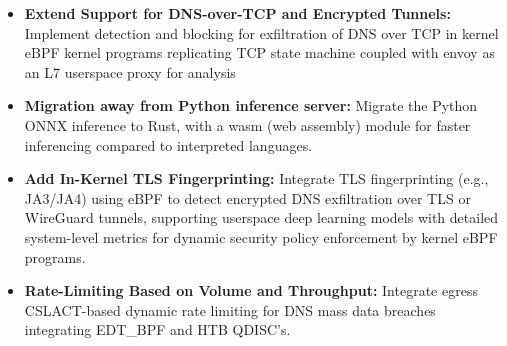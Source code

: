 \documentclass [11pt, proquest] {uwthesis}[2020/02/24]
\begin{document}
\begin{itemize}[itemsep=1pt,parsep=0pt]
  \item \textbf{Extend Support for DNS-over-TCP and Encrypted Tunnels:} Implement detection and blocking for exfiltration of DNS over TCP in kernel eBPF kernel programs replicating TCP state machine coupled with envoy as an L7 userspace proxy for analysis

  \item \textbf{Migration away from Python inference server:} Migrate the Python ONNX inference to Rust, with a wasm (web assembly) module for faster inferencing compared to interpreted languages.

  \item \textbf{Add In-Kernel TLS Fingerprinting:} Integrate TLS fingerprinting (e.g., JA3/JA4) using eBPF to detect encrypted DNS exfiltration over TLS or WireGuard tunnels, supporting userspace deep learning models with detailed system-level metrics for dynamic security policy enforcement by kernel eBPF programs.




  \item \textbf{Rate-Limiting Based on Volume and Throughput:} Integrate egress CSLACT-based dynamic rate limiting for DNS mass data breaches integrating EDT\_BPF and HTB QDISC's.


\end{itemize}
\end{document}
